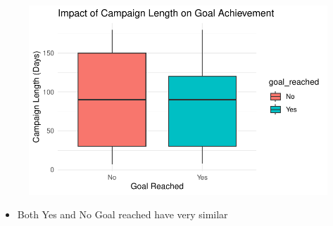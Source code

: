 \documentclass[
  letterpaper,
  DIV=11,
  numbers=noendperiod]{scrartcl}
\providecommand{\tightlist}{%
  \setlength{\itemsep}{0pt}\setlength{\parskip}{0pt}}\usepackage{longtable,booktabs,array}
\begin{document}
\begin{figure}[H]

{\centering \includegraphics{gfm_data_analysis_files/figure-pdf/time-analysis-1.pdf}

}

\end{figure}

\begin{itemize}
\tightlist
\item
  Both Yes and No Goal reached have very similar
\end{itemize}
\end{document}
